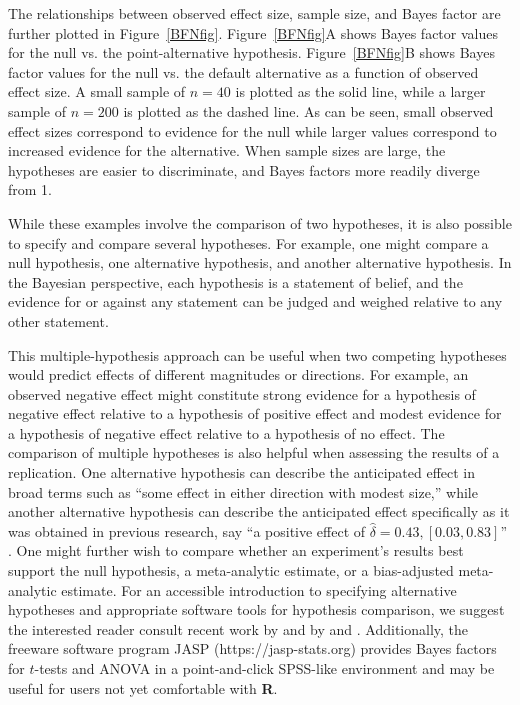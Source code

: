 \documentclass[man]{apa6}
\begin{document}
The relationships between observed effect size, sample size, and Bayes factor are further plotted in Figure~\ref{BFNfig}. Figure~\ref{BFNfig}A shows Bayes factor values for the null vs. the point-alternative hypothesis. Figure~\ref{BFNfig}B shows Bayes factor values for the null vs. the default alternative as a function of observed effect size. A small sample of $n=40$ is plotted as the solid line, while a larger sample of $n=200$ is plotted as the dashed line. As can be seen, small observed effect sizes correspond to evidence for the null while larger values correspond to increased evidence for the alternative. When sample sizes are large, the hypotheses are easier to discriminate, and Bayes factors more readily diverge from 1.  

While these examples involve the comparison of two hypotheses, it is also possible to specify and compare several hypotheses. For example, one might compare a null hypothesis, one alternative hypothesis, and another alternative hypothesis. In the Bayesian perspective, each hypothesis is a statement of belief, and the evidence for or against any statement can be judged and weighed relative to any other statement. 

This multiple-hypothesis approach can be useful when two competing hypotheses would predict effects of different magnitudes or directions. For example, an observed negative effect might constitute strong evidence for a hypothesis of negative effect relative to a hypothesis of positive effect and modest evidence for a hypothesis of negative effect relative to a hypothesis of no effect. The comparison of multiple hypotheses is also helpful when assessing the results of a replication. One alternative hypothesis can describe the anticipated effect in broad terms such as ``some effect in either direction with modest size,'' while another alternative hypothesis can describe the anticipated effect specifically as it was obtained in previous research, say ``a positive effect of $\hat{\delta} = 0.43, [0.03, 0.83]$'' \citep[see][for an example]{Boekel:etal:2014}. 
One might further wish to compare whether an experiment's results best support the null hypothesis, a meta-analytic estimate, or a bias-adjusted meta-analytic estimate.  For an accessible introduction to specifying alternative hypotheses and appropriate software tools for hypothesis comparison, we suggest the interested reader consult recent work by \citet{Dienes:2011,Dienes:2014} and by \citet{Rouder:Morey:2012} and \citet{Rouder:etal:2012}. Additionally, the freeware software program JASP (https://jasp-stats.org) provides Bayes factors for $t$-tests and ANOVA in a point-and-click SPSS-like environment and may be useful for users not yet comfortable with {\bf R}.  %
\end{document}
